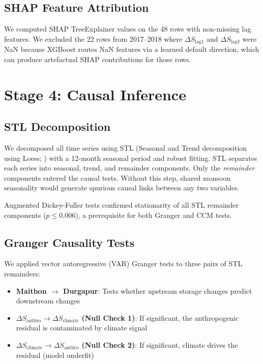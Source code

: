 \documentclass[12pt,a4paper,oneside]{report}
\newcommand{\dS}{\Delta S}
\newcommand{\dSclim}{\Delta S_{\mathrm{climate}}}
\newcommand{\dSanthro}{\Delta S_{\mathrm{anthro}}}
\begin{document}
\subsection{SHAP Feature Attribution}

We computed SHAP TreeExplainer values \citep{Lundberg2017} on the 48
rows with non-missing lag features. We excluded the 22 rows from 2017--2018
where $\dS_{\text{lag1}}$ and $\dS_{\text{lag3}}$ were NaN because XGBoost
routes NaN features via a learned default direction, which can produce
artefactual SHAP contributions for those rows.

\section{Stage 4: Causal Inference}

\subsection{STL Decomposition}

We decomposed all time series using STL (Seasonal and Trend decomposition
using Loess; \citealt{Cleveland1990}) with a 12-month seasonal period and
robust fitting. STL separates each series into seasonal, trend, and
remainder components. Only the \textit{remainder} components entered the
causal tests. Without this step, shared monsoon seasonality would generate
spurious causal links between any two variables.

Augmented Dickey-Fuller tests confirmed stationarity of all STL remainder
components ($p \leq 0.006$), a prerequisite for both Granger and CCM tests.

\subsection{Granger Causality Tests}

We applied vector autoregressive (VAR) Granger tests to three pairs of
STL remainders:
\begin{itemize}[leftmargin=*]
  \item \textbf{Maithon $\to$ Durgapur}: Tests whether upstream storage
    changes predict downstream changes
  \item \textbf{$\dSanthro \to \dSclim$ (Null Check 1)}: If significant,
    the anthropogenic residual is contaminated by climate signal
  \item \textbf{$\dSclim \to \dSanthro$ (Null Check 2)}: If significant,
    climate drives the residual (model underfit)
\end{itemize}
\end{document}
